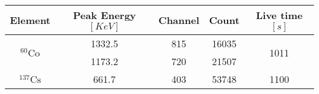\begin{tabular}{ccccc}
\toprule
          Element &  Peak Energy$[\si{KeV}]$ &  Channel &  Count &  Live time$[\si{s}]$ \\
\midrule
 \multirow{2}{*}{$^{60}\text{Co}$} &                   1332.5 &      815 &  16035 &     \multirow{2}{*}{1011} \\
              &                   1173.2 &      720 &  21507 &         \\
$^{137}\text{Cs}$ &                    661.7 &      403 &  53748 &     1100 \\
\bottomrule
\end{tabular}
